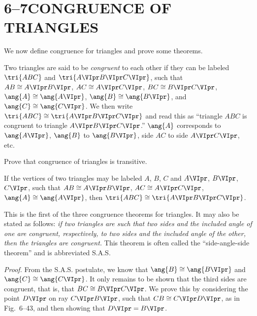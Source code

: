 \documentclass[11pt]{book}
\theoremstyle{bkplain}
\theoremstyle{XIplainnote}
\theoremstyle{bkplain}
\theoremstyle{bkplain}
\begin{document}
\section*{6--7\quad CONGRUENCE OF TRIANGLES}

We now define congruence for triangles and prove some theorems.

\begin{definition}
Two triangles are said to be \emph{congruent} to each other if they can be
labeled $\tri{ABC}$ and $\tri{A\VIpr B\VIpr C\VIpr}$, such that
$AB \cong A\VIpr B\VIpr$, $AC \cong A\VIpr C\VIpr$, $BC \cong B\VIpr C\VIpr$,
$\ang{A} \cong \ang{A\VIpr}$, $\ang{B} \cong \ang{B\VIpr}$, and $\ang{C} \cong
\ang{C\VIpr}$. We then write $\tri{ABC} \cong \tri{A\VIpr B\VIpr C\VIpr}$ and
read this as ``triangle $ABC$ is congruent to triangle $A\VIpr B\VIpr
C\VIpr$.'' $\ang{A}$ corresponds to $\ang{A\VIpr}$, $\ang{B}$ to
$\ang{B\VIpr}$, side $AC$ to side $A\VIpr C\VIpr$, etc.
\end{definition}

Prove that congruence of triangles is transitive.

\begin{theorem}
If the vertices of two triangles may be labeled $A$, $B$, $C$ and $A\VIpr$,
$B\VIpr$, $C\VIpr$, such that $AB \cong A\VIpr B\VIpr$, $AC \cong A\VIpr
C\VIpr$, $\ang{A} \cong \ang{A\VIpr}$, then $\tri{ABC} \cong \tri{A\VIpr
B\VIpr C\VIpr}$.
\end{theorem}

\begin{remark}
This is the first of the three congruence theorems for triangles. It may also
be stated as follows: \emph{if two triangles are such that two sides and the
included angle of one are congruent, respectively, to two sides and the
included angle of the other, then the triangles are congruent.} This theorem
is often called the ``side-angle-side theorem'' and is abbreviated S.A.S.
\end{remark}

\emph{Proof.} From the S.A.S. postulate, we know that $\ang{B} \cong
\ang{B\VIpr}$ and $\ang{C} \cong \ang{C\VIpr}$. It only remains to be shown
that the third sides are congruent, that is, that $BC \cong B\VIpr C\VIpr$. We
prove this by considering the point $D\VIpr$ on ray $C\VIpr B\VIpr$, such that
$CB \cong C\VIpr D\VIpr$, as in Fig.~6--43, and then showing that $D\VIpr =
B\VIpr$.
\end{document}
